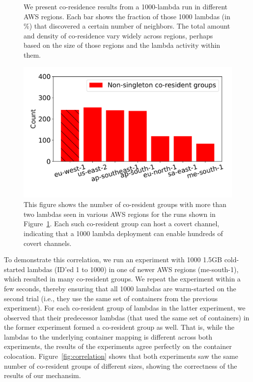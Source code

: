 \begin{figure}[!t]
\begin{subfigure}{.33\textwidth}
  \end{subfigure}
  \caption{We present co-residence results from a 1000-lambda run in different AWS regions. Each bar shows the fraction 
  of those 1000 lambdas (in \%) that discovered a certain number of neighbors. The total amount and density of co-residence 
  vary widely across regions, perhaps based on the size of those regions and the lambda activity within them. }
  \label{fig:awsregions}
  \end{figure}

  
\begin{figure}[!t]
  \includegraphics[width=.99\linewidth]{fig/clusters.pdf}
  \caption{This figure shows the number of co-resident groups with more than two lambdas
  seen in various AWS regions for the runs shown in Figure~\ref{fig:awsregions}. 
  Each such co-resident group can host a covert channel, indicating that a 1000 lambda 
  deployment can enable hundreds of covert channels.
\label{fig:clusters}}
\end{figure}

To demonstrate this correlation, we run an
experiment with 1000 1.5GB cold-started lambdas (ID'ed 1 to 1000) in one of
newer AWS regions (me-south-1), which resulted in many co-resident groups.
We repeat the experiment within a few seconds, thereby ensuring that all 1000
lambdas are warm-started on the second trial (i.e., they use the same set of
containers from the previous experiment).  For each co-resident group of lambdas
in the latter experiment, we observed that their predecessor lambdas (that used
the same set of containers) in the former experiment formed a co-resident group
as well. That is, while the lambdas to the underlying container mapping is
different across both experiments, the results of the experiments agree
perfectly on the container colocation. Figure~\ref{fig:correlation} shows that
both experiments saw the same number of co-resident groups of different sizes,
showing the correctness of the results of our mechansim.

